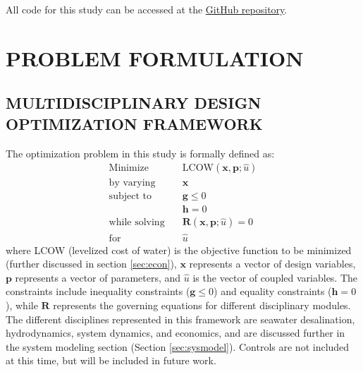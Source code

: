 \documentclass[twocolumn,10pt]{asme2e}
\begin{document}
All code for this study can be accessed at the \href{https://github.com/symbiotic-engineering/mdo\_wd2}{GitHub repository}.

\section{PROBLEM FORMULATION}
\subsection{MULTIDISCIPLINARY DESIGN OPTIMIZATION FRAMEWORK}
The optimization problem in this study is formally defined as:
\begin{align*} 
    \text{Minimize} \quad & \text{LCOW}(\mathbf{x},\mathbf{p}; \hat{u})  \\
    \text{by varying} \quad & \mathbf{x}\\
    \text{subject to } \quad &  \mathbf{g} \leq 0 \\
                             &  \mathbf{h} = 0 \\
    \text{while solving} \quad & \mathbf{R}(\mathbf{x},\mathbf{p};\hat{u}) = 0\\
    \text{for } \quad & \hat{u}
    \label{eq:problem}
\end{align*}
\noindent where LCOW (levelized cost of water) is the objective function to be minimized (further discussed in section \ref{sec:econ}), $\mathbf{x}$ represents a vector of design variables, $\mathbf{p}$ represents a vector of parameters, and $\hat{u}$ is the vector of coupled variables. The constraints include inequality constraints ($\mathbf{g} \leq 0$) and equality constraints ($\mathbf{h}=0$), while $\mathbf{R}$ represents the governing equations for different disciplinary modules. The different disciplines represented in this framework are seawater desalination, hydrodynamics, system dynamics, and economics, and are discussed further in the system modeling section (Section \ref{sec:sysmodel}). Controls are not included at this time, but will be included in future work.
\end{document}
